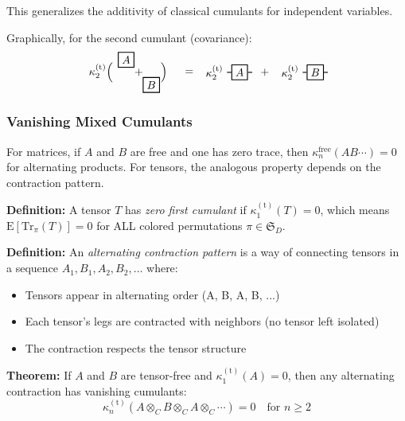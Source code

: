 This generalizes the additivity of classical cumulants for independent variables.

Graphically, for the second cumulant (covariance):
\[
\begin{tikzpicture}[baseline=-.5em, scale=0.8]
   \node at (-1,0) {$\kappa_2^{(\mathrm{t})}\Big($};
   \node[draw, thick] (A) at (0,.5) {$A$};
   \node at (.5,0) {$+$};
   \node[draw, thick] (B) at (1,-.5) {$B$};
   \node at (1.5,0) {$\Big)$};
   
   \node at (2.5,0) {$=$};
   
   \node at (3.5,0) {$\kappa_2^{(\mathrm{t})}$};
   \node[draw, thick] (A2) at (4.5,0) {$A$};
   \draw[thick] (A2) -- ++(-.5,0);
   \draw[thick] (A2) -- ++(.5,0);
   
   \node at (5.5,0) {$+$};
   
   \node at (6.5,0) {$\kappa_2^{(\mathrm{t})}$};
   \node[draw, thick] (B2) at (7.5,0) {$B$};
   \draw[thick] (B2) -- ++(-.5,0);
   \draw[thick] (B2) -- ++(.5,0);
\end{tikzpicture}
\]

\subsubsection{Vanishing Mixed Cumulants}

For matrices, if $A$ and $B$ are free and one has zero trace, then $\kappa_n^{\text{free}}(AB\cdots) = 0$ for alternating products. For tensors, the analogous property depends on the contraction pattern.

\textbf{Definition:} A tensor $T$ has \emph{zero first cumulant} if $\kappa_1^{(\mathrm{t})}(T) = 0$, which means $\mathrm{E}[\mathrm{Tr}_{\pi}(T)] = 0$ for ALL colored permutations $\pi \in \mathfrak{S}_D$.

\textbf{Definition:} An \emph{alternating contraction pattern} is a way of connecting tensors in a sequence $A_1, B_1, A_2, B_2, \ldots$ where:
\begin{itemize}
\item Tensors appear in alternating order (A, B, A, B, ...)
\item Each tensor's legs are contracted with neighbors (no tensor left isolated)
\item The contraction respects the tensor structure
\end{itemize}

\textbf{Theorem:} If $A$ and $B$ are tensor-free and $\kappa_1^{(\mathrm{t})}(A) = 0$, then any alternating contraction has vanishing cumulants:
\[
   \kappa_n^{(\mathrm{t})}(A \otimes_C B \otimes_C A \otimes_C \cdots) = 0 \quad \text{for } n \geq 2
\]

